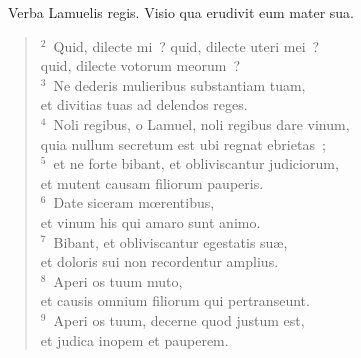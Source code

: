 ~Verba Lamuelis regis. Visio qua erudivit eum mater sua.
\begin{flushleft}\begin{verse}\vspace{6pt}${}^{2}$~Quid, dilecte mi~? quid, dilecte uteri mei~?\\ quid, dilecte votorum meorum~?\\
${}^{3}$~Ne dederis mulieribus substantiam tuam,\\ et divitias tuas ad delendos reges.\\
${}^{4}$~Noli regibus, o Lamuel, noli regibus dare vinum,\\ quia nullum secretum est ubi regnat ebrietas~;\\
${}^{5}$~et ne forte bibant, et obliviscantur judiciorum,\\ et mutent causam filiorum pauperis.\\
${}^{6}$~Date siceram mœrentibus,\\ et vinum his qui amaro sunt animo.\\
${}^{7}$~Bibant, et obliviscantur egestatis su\ae ,\\ et doloris sui non recordentur amplius.\\
${}^{8}$~Aperi os tuum muto,\\ et causis omnium filiorum qui pertranseunt.\\
${}^{9}$~Aperi os tuum, decerne quod justum est,\\ et judica inopem et pauperem.\end{verse}\end{flushleft}


